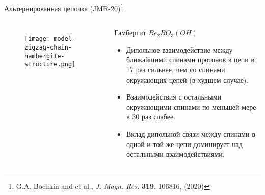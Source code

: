 \begin{frame}{Альтернированная цепочка (JMR-20)\footnote[frame]{
        G.A. Bochkin and et al., \textit{J. Magn. Res.} \textbf{319}, 106816, (2020)}}
\begin{columns}

    \begin{figure}
      \texttt{[image: model-zigzag-chain-hambergite-structure.png]}
      \caption{}
    \end{figure}

    \begin{block}{Гамбергит $Be_2BO_3(OH)$ }
        \begin{itemize}
            \item Дипольное взаимодействие между ближайшими спинами протонов в цепи в 17 раз сильнее, чем со спинами окружающих цепей (в худшем случае).
            \item Взаимодействия с остальными окружающими спинами по меньшей мере в 30 раз слабее.
            \item Вклад дипольной связи между спинами в одной и той же цепи доминирует над остальными взаимодействиями.
        \end{itemize}
    \end{block}

\end{columns}
\end{frame}
